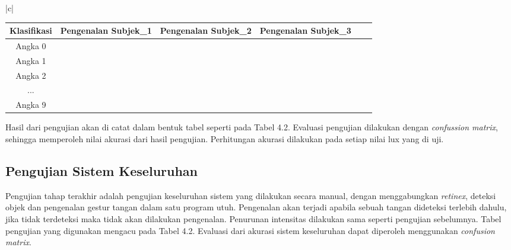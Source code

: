 \begin{table}[H]
\begin{tabular}{|c|}
	\\
	\begin{tabular}{|c|c|c|c|c|c|c|c|c|c|c|c|c|c|c|c|c|c|c|c|c|c|c|c|c|c|c|c|c|c|c|c|c|}
		\hline
		Klasifikasi & \multicolumn{10}{|c|}{Pengenalan Subjek\_1}& \multicolumn{10}{|c|}{Pengenalan Subjek\_2}& \multicolumn{10}{|c|}{Pengenalan Subjek\_3}\\
		\hline Angka 0 & & & &&&&&&&&&&&&&&&&&&&&&&&&&&&\\
		\hline Angka 1 & & & &&&&&&&&&&&&&&&&&&&&&&&&&&&\\	
		\hline Angka 2 & & & &&&&&&&&&&&&&&&&&&&&&&&&&&&\\
		\hline ... & & & &&&&&&&&&&&&&&&&&&&&&&&&&&& \\
		\hline Angka 9 & & & &&&&&&&&&&&&&&&&&&&&&&&&&&& \\
		\hline
	\end{tabular}
\end{tabular}

\end{table}

Hasil dari pengujian akan di catat dalam bentuk tabel seperti pada Tabel 4.2. Evaluasi pengujian dilakukan dengan \emph{confussion matrix}, sehingga memperoleh nilai akurasi dari hasil pengujian. Perhitungan akurasi dilakukan pada setiap nilai lux yang di uji.
\subsection{Pengujian Sistem Keseluruhan}
Pengujian tahap terakhir adalah pengujian keseluruhan sistem yang dilakukan secara manual, dengan menggabungkan \emph{retinex}, deteksi objek dan pengenalan gestur tangan dalam satu program utuh. Pengenalan akan terjadi apabila sebuah tangan dideteksi terlebih dahulu, jika tidak terdeteksi maka tidak akan dilakukan pengenalan. Penurunan intensitas dilakukan sama seperti pengujian sebelumnya. Tabel pengujian yang digunakan mengacu pada Tabel 4.2. Evaluasi dari akurasi sistem keseluruhan dapat diperoleh menggunakan \emph{confusion matrix}.